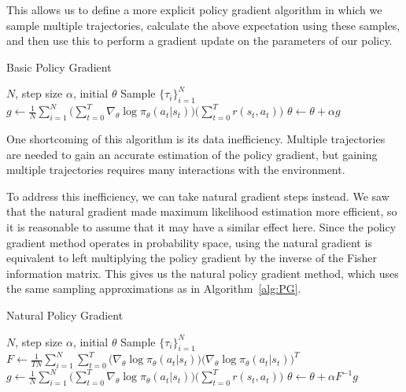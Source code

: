 \documentclass[twoside,10pt]{article}
\begin{document}
This allows us to define a more explicit policy gradient algorithm in which we sample multiple trajectories, calculate the above expectation using these samples, and then use this to perform a gradient update on the parameters of our policy.

{\centering
\begin{minipage}{0.7\linewidth}
\begin{algorithm}[H]
    \caption{Basic Policy Gradient}
    \label{alg:PG}
    \begin{algorithmic}
        \Require $N$, step size $\alpha$, initial $\theta$
            \State Sample $\{ \tau_i \}_{i=1}^N$
            \State $g \gets \frac{1}{N} \sum_{i=1}^N \big( \sum_{t=0}^T \nabla_\theta \log \pi_\theta(a_t \vert s_t) \big) \big( \sum_{t=0}^T r(s_t, a_t) \big)$
            \State $\theta \gets \theta + \alpha g$
        \EndWhile
    \end{algorithmic}
\end{algorithm}
\end{minipage}
\par}
\vspace{7mm}

One shortcoming of this algorithm is its data inefficiency. Multiple trajectories are needed to gain an accurate estimation of the policy gradient, but gaining multiple trajectories requires many interactions with the environment.

To address this inefficiency, we can take natural gradient steps instead\cite{npg}. We saw that the natural gradient made maximum likelihood estimation more efficient, so it is reasonable to assume that it may have a similar effect here. Since the policy gradient method operates in probability space, using the natural gradient is equivalent to left multiplying the policy gradient by the inverse of the Fisher information matrix. This gives us the natural policy gradient method, which uses the same sampling approximations as in Algorithm~\ref{alg:PG}.

{\centering
\begin{minipage}{0.7\linewidth}
\begin{algorithm}[H]
    \caption{Natural Policy Gradient}
    \label{alg:NPG}
    \begin{algorithmic}
        \Require $N$, step size $\alpha$, initial $\theta$
            \State Sample $\{ \tau_i \}_{i=1}^N$
            \State $F \gets \frac{1}{T N} \sum_{i=1}^N \sum_{t=0}^T \big( \nabla_\theta \log \pi_\theta(a_t \vert s_t) \big) \big( \nabla_\theta \log \pi_\theta(a_t \vert s_t) \big)^T$
            \State $g \gets \frac{1}{N} \sum_{i=1}^N \big( \sum_{t=0}^T \nabla_\theta \log \pi_\theta(a_t \vert s_t) \big) \big( \sum_{t=0}^T r(s_t, a_t) \big)$
            \State $\theta \gets \theta + \alpha F^{-1} g$
        \EndWhile
    \end{algorithmic}
\end{algorithm}
\end{minipage}
\par}
\vspace{7mm}
\end{document}
